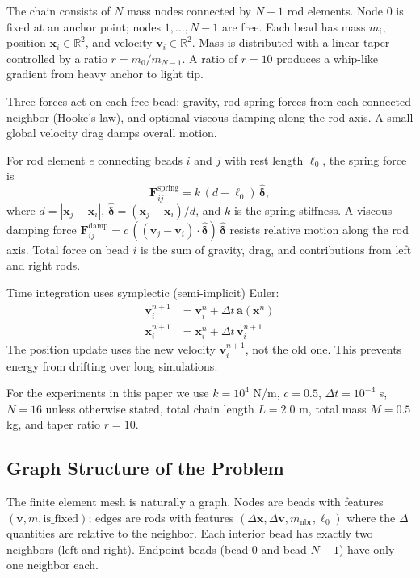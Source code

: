 \documentclass[conference]{IEEEtran}
\begin{document}
The chain consists of $N$ mass nodes connected by $N-1$ rod elements. Node 0 is fixed at an anchor point; nodes $1, \ldots, N-1$ are free. Each bead has mass $m_i$, position $\mathbf{x}_i \in \mathbb{R}^2$, and velocity $\mathbf{v}_i \in \mathbb{R}^2$. Mass is distributed with a linear taper controlled by a ratio $r = m_0 / m_{N-1}$. A ratio of $r = 10$ produces a whip-like gradient from heavy anchor to light tip.

Three forces act on each free bead: gravity, rod spring forces from each connected neighbor (Hooke's law), and optional viscous damping along the rod axis. A small global velocity drag damps overall motion.

For rod element $e$ connecting beads $i$ and $j$ with rest length $\ell_0$, the spring force is
\begin{equation}
    \mathbf{F}_{ij}^{\text{spring}} = k \, (d - \ell_0) \, \hat{\boldsymbol{\delta}},
    \label{eq:spring}
\end{equation}
where $d = |\mathbf{x}_j - \mathbf{x}_i|$, $\hat{\boldsymbol{\delta}} = (\mathbf{x}_j - \mathbf{x}_i)/d$, and $k$ is the spring stiffness. A viscous damping force $\mathbf{F}_{ij}^{\text{damp}} = c \, ((\mathbf{v}_j - \mathbf{v}_i) \cdot \hat{\boldsymbol{\delta}}) \, \hat{\boldsymbol{\delta}}$ resists relative motion along the rod axis. Total force on bead $i$ is the sum of gravity, drag, and contributions from left and right rods.

Time integration uses symplectic (semi-implicit) Euler:
\begin{align}
    \mathbf{v}_i^{n+1} &= \mathbf{v}_i^n + \Delta t \, \mathbf{a}(\mathbf{x}^n) \label{eq:symp_v}\\
    \mathbf{x}_i^{n+1} &= \mathbf{x}_i^n + \Delta t \, \mathbf{v}_i^{n+1} \label{eq:symp_x}
\end{align}
The position update uses the new velocity $\mathbf{v}_i^{n+1}$, not the old one. This prevents energy from drifting over long simulations.

For the experiments in this paper we use $k = 10^4$ N/m, $c = 0.5$, $\Delta t = 10^{-4}$ s, $N = 16$ unless otherwise stated, total chain length $L = 2.0$ m, total mass $M = 0.5$ kg, and taper ratio $r = 10$.

\subsection{Graph Structure of the Problem}

The finite element mesh is naturally a graph. Nodes are beads with features $(\mathbf{v}, m, \text{is\_fixed})$; edges are rods with features $(\Delta\mathbf{x}, \Delta\mathbf{v}, m_{\text{nbr}}, \ell_0)$ where the $\Delta$ quantities are relative to the neighbor. Each interior bead has exactly two neighbors (left and right). Endpoint beads (bead 0 and bead $N-1$) have only one neighbor each.
\end{document}
